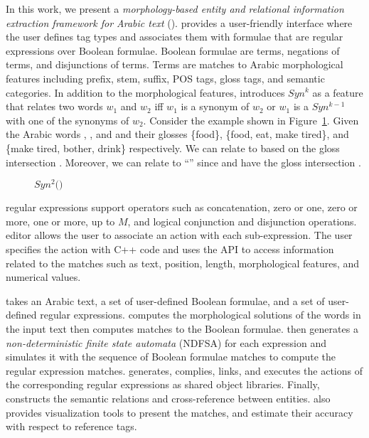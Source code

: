 In this work, we present a {\em morphology-based entity and relational information extraction framework for Arabic text} (\framework). 
\framework provides a user-friendly interface where the user defines tag types 
and associates them with \framework formulae that are regular expressions over 
\framework Boolean formulae. 
Boolean formulae are terms, negations of terms, and disjunctions of terms. 
Terms are matches to Arabic morphological features including 
prefix, stem, suffix, POS tags, gloss tags, and semantic categories. 
In addition to the morphological features, \framework 
introduces $Syn^k$ as a feature that relates two words $w_1$ and $w_2$ iff
$w_1$ is a synonym of $w_2$ or $w_1$ is a $Syn^{k-1}$ with one of the synonyms of $w_2$. 
Consider the example shown in Figure~\ref{fig:introsynEx}. 
Given the Arabic words , , and  and their glosses \{food\}, \{food, eat, make tired\}, and \{make tired, bother, drink\} respectively. 
We can relate  to  based on the gloss intersection . 
Moreover, we can relate  to ``'' since  and  have the gloss intersection .

\begin{figure}[h]
\begin{center}
  \caption{$Syn^2($$)$}
  \label{fig:introsynEx}
\end{center}
\end{figure}

\framework regular expressions support operators such as concatenation, zero or one, zero or more, one or more, up to $M$, and logical conjunction and disjunction operations. 
\framework editor allows the user to associate an action with each \framework sub-expression. 
The user specifies the action with C++ code and uses the \framework API to access information related to 
the matches such as text, position, length, morphological features, and numerical values.

\framework takes an Arabic text, a set of user-defined \framework Boolean formulae, and a set of user-defined \framework regular expressions. \framework computes the morphological solutions of the words in the input text then computes matches to the Boolean formulae. 
\framework then generates a {\em non-deterministic finite state automata} (NDFSA) for each expression and simulates it with the sequence of Boolean formulae matches to compute the regular expression matches. 
\framework generates, complies, links, and executes the actions of the corresponding regular expressions as shared object libraries. 
Finally, \framework constructs the semantic relations and cross-reference between entities. 
\framework also provides visualization tools to present the matches, and estimate their accuracy with respect to reference tags.

